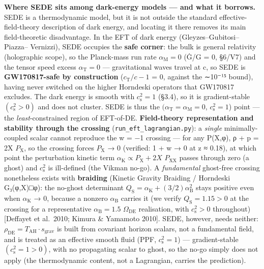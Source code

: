 \documentclass[
  10pt,
]{article}
\begin{document}
\textbf{Where SEDE sits among dark-energy models --- and what it
borrows.} SEDE is a thermodynamic model, but it is not outside the
standard effective-field-theory description of dark energy, and locating
it there removes its main field-theoretic disadvantage. In the EFT of
dark energy (Gleyzes--Gubitosi--Piazza-- Vernizzi), SEDE occupies the
\textbf{safe corner}: the bulk is general relativity (holographic
scope), so the Planck-mass run rate
\textbf{\(\alpha _{\mathrm{M}} = 0\)} (Ġ/G = 0, §6/V7) and the tensor
speed excess \textbf{\(\alpha _{\mathrm{T}} = 0\)} --- gravitational
waves travel at c, so SEDE is \textbf{GW170817-safe by construction}
(\textbar{}\(c_{\mathrm{T}}/c - 1\)\textbar{} = 0, against the ∼10⁻¹⁵
bound), having never switched on the higher Horndeski operators that
GW170817 excludes. The dark energy is smooth with
\textbf{\(c_{\mathrm{s}}^{2} = 1\)} (§3.4), so it is gradient-stable
\((c_{\mathrm{s}}^{2} > 0)\) and does not cluster. SEDE is thus the
\((\alpha _{\mathrm{T}} = \alpha _{\mathrm{M}} = 0\),
\(c_{\mathrm{s}}^{2} = 1\)) point --- the \emph{least}-constrained
region of EFT-of-DE. \textbf{Field-theory representation and stability
through the crossing} (\texttt{run\_eft\_lagrangian.py}): a
\emph{single} minimally-coupled scalar cannot reproduce the w = −1
crossing --- for any P(X,φ), ρ + p = 2X \(P_{\mathrm{X}}\), so the
crossing forces \(P_{\mathrm{X}}\) → 0 (verified: 1 + w → 0 at z ≈
0.18), at which point the perturbation kinetic term
\(\alpha _{\mathrm{K}} \propto  P_{\mathrm{X}} + 2X\)
\(P_{\mathrm{XX}}\) passes through zero (a ghost) and
\(c_{\mathrm{s}}^{2}\) is ill-defined (the Vikman no-go). A
\emph{fundamental} ghost-free crossing nonetheless exists with
\textbf{braiding} (Kinetic Gravity Braiding / Horndeski G₃(φ,X)□φ): the
no-ghost determinant
\(Q_{\mathrm{S}} = \alpha _{\mathrm{K}} + (3/2)\alpha _{\mathrm{B}}^{2}\)
stays positive even when \(\alpha _{\mathrm{K}}\) → 0, because a nonzero
\(\alpha _{\mathrm{B}}\) carries it (we verify
\(Q_{\mathrm{S}} = 1.15 > 0\) at the crossing for a representative
\(\alpha _{\mathrm{B}} = 1.5\) \(\Omega _{\mathrm{DE}}\) realisation,
with \(c_{\mathrm{s}}^{2} > 0\) throughout) {[}Deffayet et al.~2010;
Kimura \& Yamamoto 2010{]}. SEDE, however, needs neither:
\(\rho _{\mathrm{DE}} = T_{\mathrm{AH}}\cdot s_{\mathrm{grav}}\) is
built from covariant horizon scalars, not a fundamental field, and is
treated as an effective smooth fluid (PPF, \(c_{\mathrm{s}}^{2} = 1\))
--- gradient-stable \((c_{\mathrm{s}}^{2} = 1 > 0)\), with no
propagating scalar to ghost, so the no-go simply does not apply (the
thermodynamic content, not a Lagrangian, carries the prediction).
\end{document}
